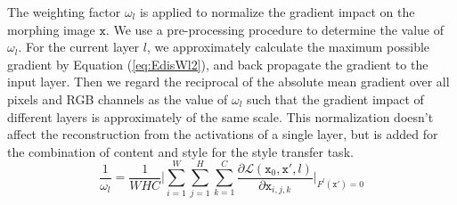 \documentclass{article}
\begin{document}
The weighting factor $\omega_{l}$ is applied to normalize the gradient impact on the morphing image $\texttt{x}$. We use a pre-processing procedure to determine the value of $\omega_{l}$.
For the current layer $l$, we approximately calculate the maximum possible gradient by Equation (\ref{eq:EdisWl2}), %
and back propagate the gradient to the input layer.
Then we regard the reciprocal of the absolute mean gradient over all pixels and RGB channels as the value of $\omega_{l}$ such that the gradient impact of different layers is approximately of the same scale.
This normalization doesn't affect the reconstruction from the activations of a single layer,
but is added for the combination of content and style for the style transfer task.
\setlength{\belowdisplayskip}{2pt}
\setlength{\abovedisplayskip}{2pt}
\begin{equation}
\frac{1}{\omega_{l}} =\frac{1}{W H C}\bigg|  \displaystyle{ \sum_{i=1}^{W}} \displaystyle{ \sum_{j=1}^{H}} \displaystyle{\sum_{k=1}^{C}}\frac{\partial \mathcal{L}(\texttt{x}_0,\texttt{x}',l)}{\partial{\texttt{x}_{i,j,k}}} \bigg|_{F^l(\texttt{x}')=0}
\label{eq:EdisWl2}
\end{equation}

\end{document}
